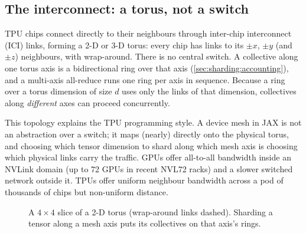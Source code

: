 \subsection{The interconnect: a torus, not a switch}

TPU chips connect directly to their neighbours through inter-chip interconnect (ICI) links, forming a 2-D
or 3-D torus: every chip has links to its $\pm x$, $\pm y$ (and $\pm z$) neighbours, with
wrap-around. There is no central switch. A collective along one torus axis is a bidirectional ring
over that axis (\cref{sec:sharding:accounting}), and a multi-axis all-reduce runs one ring per axis in
sequence. Because a ring over a torus dimension of size $d$ uses only the links of that dimension,
collectives along \emph{different} axes can proceed concurrently.

This topology explains the TPU programming style. A device mesh in JAX is not an abstraction
over a switch; it maps (nearly) directly onto the physical torus, and choosing which tensor
dimension to shard along which mesh axis is choosing which physical links carry the traffic. GPUs
offer all-to-all bandwidth inside an NVLink domain (up to 72 GPUs in recent NVL72 racks) and a
slower switched network outside it. TPUs offer uniform neighbour bandwidth across a pod of
thousands of chips but non-uniform distance.

\begin{figure}[t]
\centering
{}
\caption{A $4\times4$ slice of a 2-D torus (wrap-around links dashed). Sharding a tensor along a
mesh axis puts its collectives on that axis's rings.}
\label{fig:accel:torus}
\end{figure}


